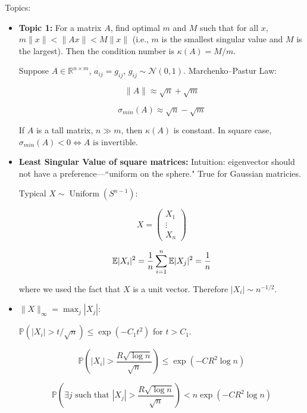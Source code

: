 Topics:

\begin{itemize}

\item \textbf{Topic 1:} For a matrix \(A\), find optimal \(m\) and \(M\) such that for all \(x\), \(m \lVert x \rVert < \lVert Ax \rVert < M \lVert x \rVert\) (i.e., \(m
\) is the smallest singular value and \(M\) is the largest). Then the condition number is \(\kappa(A) = M/m\).

Suppose \(A \in \mathbb{R}^{n \times m}\), \(a_{ij} = g_{ij}\), \(g_{ij} \sim \mathcal{N}(0,1)\). Marchenko–Pastur Law:

\[
\lVert A \rVert \approx \sqrt{n} + \sqrt{m}
\]

\[
\sigma_{min}(A) \approx \sqrt{n} - \sqrt{m}
\]

If \(A\) is a tall matrix, \(n \gg m\), then \(\kappa(A) \) is constant. In square case, \(\sigma_{min}(A) < 0 \iff A \text{ is invertible}\).

\item \textbf{Least Singular Value of square matrices:} Intuition: eigenvector should not have a preference---``uniform on the sphere." True for Gaussian matricies. 

Typical \(X \sim \operatorname{Uniform}(S^{n-1})\): 

\[
X = \begin{pmatrix} X_1 \\ \vdots \\ X_n \end{pmatrix}
\]

\[
\mathbb{E}| X_i|^2 =  \frac{1}{n} \sum_{i=1}^n \mathbb{E} | X_j|^2 = \frac{1}{n}
\]

where we used the fact that \(X\) is a unit vector. Therefore \(|X_i| \sim n^{-1/2}\). 

\item \(\lVert X \rVert_\infty = \max_j |X_j|\):

 \(\mathbb{P}(|X_i| > t /\sqrt{n}) \leq \exp(-C_1 t^2) \) for \(t > C_1\).


\[
\mathbb{P} \left( |X_i| >  \frac{R \sqrt{\log n}}{\sqrt{n}} \right) \leq \exp(-CR^2 \log n)
\]


\[
\mathbb{P}\left( \exists j \text{ such that } |X_j | > \frac{R \sqrt{\log n}}{\sqrt{n}} \right) < n \exp(-CR^2 \log n)
\]


\end{itemize}
